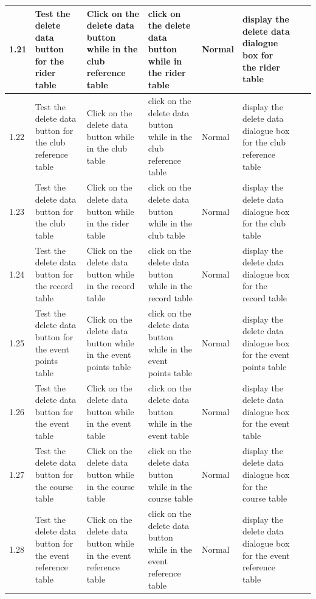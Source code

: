 \begin{landscape}
\begin{center}
\begin{longtable}{|p{1.5cm}|p{2.5cm}|p{2.5cm}|p{2cm}|p{2cm}|p{2cm}|p{2cm}|p{2cm}|}
        1.21 & Test the delete data button for the rider table & Click on the delete data button while in the club reference table & click on the delete data button while in the rider table & Normal & display the delete data dialogue box for the rider table & & \\ \hline
        1.22 & Test the delete data button for the club reference table & Click on the delete data button while in the club table & click on the delete data button while in the club reference table & Normal & display the delete data dialogue box for the club reference table & & \\ \hline
        1.23 & Test the delete data button for the club  table & Click on the delete data button while in the rider table & click on the delete data button while in the club table & Normal & display the delete data dialogue box for the club  table & & \\ \hline
        \rowcolor{DarkGray}1.24 & Test the delete data button for the record  table & Click on the delete data button while in the record table & click on the delete data button while in the record table & Normal & display the delete data dialogue box for the record  table & & \\ \hline
        \rowcolor{DarkGray}1.25 & Test the delete data button for the event points  table & Click on the delete data button while in the event points table & click on the delete data button while in the event points table & Normal & display the delete data dialogue box for the event points  table & & \\ \hline
        \rowcolor{DarkGray}1.26 & Test the delete data button for the event  table & Click on the delete data button while in the event table & click on the delete data button while in the event table & Normal & display the delete data dialogue box for the event  table & & \\ \hline
        \rowcolor{DarkGray}1.27 & Test the delete data button for the course  table & Click on the delete data button while in the course table & click on the delete data button while in the course table & Normal & display the delete data dialogue box for the course  table & & \\ \hline
        \rowcolor{DarkGray}1.28 & Test the delete data button for the event reference  table & Click on the delete data button while in the event reference table & click on the delete data button while in the event reference table & Normal & display the delete data dialogue box for the event reference  table & & \\ \hline

\end{longtable}
\end{center}
\end{landscape}
